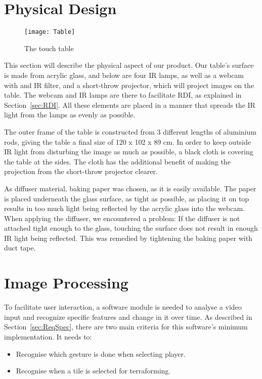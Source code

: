 \section{Physical Design} 
\begin{figure} [!h]
\centering \texttt{[image: Table]}
\label{Fig:Table} \caption{The touch table}
\end{figure}
This section will describe the physical aspect of our product.
Our table's surface is made from acrylic glass, and below are four IR lamps, as well as a webcam with and IR filter, and a short-throw projector, which will project images on the table. The webcam and IR lamps are there to facilitate RDI, as explained in Section~\ref{sec:RDI}. All these elements are placed in a manner that spreads the IR light from the lamps as evenly as possible.

The outer frame of the table is constructed from 3 different lengths of aluminium rods, giving the table a final size of 120 x 102 x 89 cm.
In order to keep outside IR light from disturbing the image as much as possible, a black cloth is covering the table at the sides. The cloth has the additional benefit of making the projection from the short-throw projector clearer. 

As diffuser material, baking paper was chosen, as it is easily available. The paper is placed underneath the glass surface, as tight as possible, as placing it on top results in too much light being reflected by the acrylic glass into the webcam. When applying the diffuser, we encountered a problem: If the diffuser is not attached tight enough to the glass, touching the surface does not result in enough IR light being reflected. This was remedied by tightening the baking paper with duct tape.

\section{Image Processing}
To facilitate user interaction, a software module is needed to analyse a video input and recognize specific features and change in it over time. As described in Section~\ref{sec:ReqSpec}, there are two main criteria for this software's minimum implementation. It needs to:
\begin{itemize}
\item Recognise which gesture is done when selecting player.
\item Recognise when a tile is selected for terraforming.
\end{itemize}

